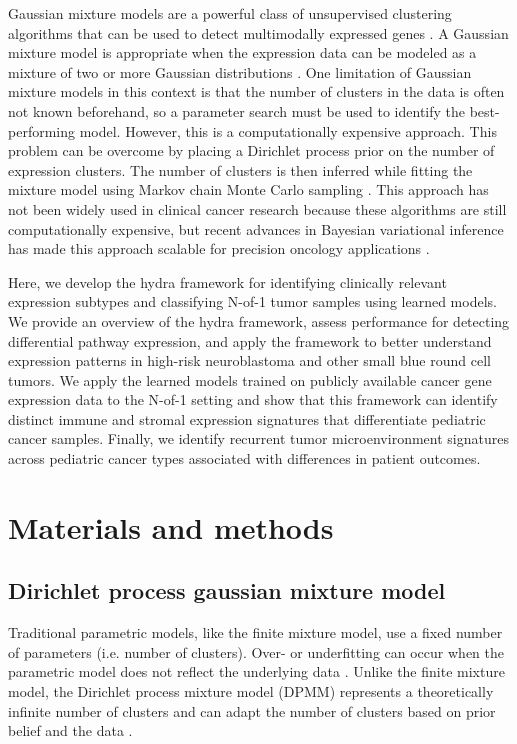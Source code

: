\documentclass[10pt,letterpaper]{article}
\begin{document}
Gaussian mixture models are a powerful class of unsupervised clustering algorithms that can be used to detect multimodally expressed genes \cite{ghoshMixtureModelsAssessing2004,dahlModelBasedClusteringExpression2006,kimVariableSelectionClustering2006}. A Gaussian mixture model is appropriate when the expression data can be modeled as a mixture of two or more Gaussian distributions \cite{gelmanBayesianDataAnalysis2013}. One limitation of Gaussian mixture models in this context is that the number of clusters in the data is often not known beforehand, so a parameter search must be used to identify the best-performing model. However, this is a computationally expensive approach. This problem can be overcome by placing a Dirichlet process prior on the number of expression clusters. The number of clusters is then inferred while fitting the mixture model using Markov chain Monte Carlo sampling \cite{gelmanBayesianDataAnalysis2013}. This approach has not been widely used in clinical cancer research because these algorithms are still computationally expensive, but recent advances in Bayesian variational inference has made this approach scalable for precision oncology applications \cite{thallBayesianNonparametricStatistics2017}. 

Here, we develop the hydra framework for identifying clinically relevant expression subtypes and classifying N-of-1 tumor samples using learned models. We provide an overview of the hydra framework, assess performance for detecting differential pathway expression, and apply the framework to better understand expression patterns in high-risk neuroblastoma and other small blue round cell tumors. We apply the learned models trained on publicly available cancer gene expression data to the N-of-1 setting and show that this framework can identify distinct immune and stromal expression signatures that differentiate pediatric cancer samples. Finally, we identify recurrent tumor microenvironment signatures across pediatric cancer types associated with differences in patient outcomes.
  
\section*{Materials and methods}
\subsection*{Dirichlet process gaussian mixture model}
Traditional parametric models, like the finite mixture model, use a fixed number of parameters (i.e. number of clusters). Over- or underfitting can occur when the parametric model does not reflect the underlying data \cite{teh2010dirichlet}. Unlike the finite mixture model, the Dirichlet process mixture model (DPMM) represents a theoretically infinite number of clusters and can adapt the number of clusters based on prior belief and the data \cite{gelmanBayesianDataAnalysis2013, antoniakMixturesDirichletProcesses1974, teh2010dirichlet}.
\end{document}
